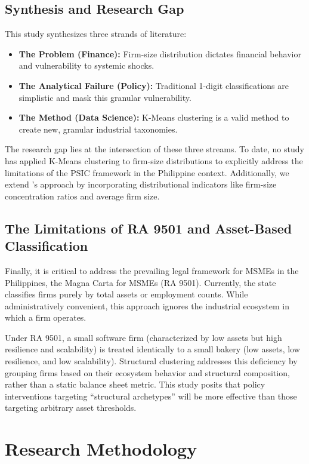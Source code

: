 \documentclass[acmtog, nonacm]{acmart}
\begin{document}
\subsection{Synthesis and Research Gap}
This study synthesizes three strands of literature:
\begin{itemize}
    \item \textbf{The Problem (Finance):} Firm-size distribution dictates financial behavior and vulnerability to systemic shocks.
    \item \textbf{The Analytical Failure (Policy):} Traditional 1-digit classifications are simplistic and mask this granular vulnerability.
    \item \textbf{The Method (Data Science):} K-Means clustering is a valid method to create new, granular industrial taxonomies.
\end{itemize}

The research gap lies at the intersection of these three streams. To date, no study has applied K-Means clustering to firm-size distributions to explicitly address the limitations of the PSIC framework in the Philippine context. Additionally, we extend \citet{karaca2018}'s approach by incorporating distributional indicators like firm-size concentration ratios and average firm size.

\subsection{The Limitations of RA 9501 and Asset-Based Classification}
Finally, it is critical to address the prevailing legal framework for MSMEs in the Philippines, the Magna Carta for MSMEs (RA 9501). Currently, the state classifies firms purely by total assets or employment counts. While administratively convenient, this approach ignores the industrial ecosystem in which a firm operates.

Under RA 9501, a small software firm (characterized by low assets but high resilience and scalability) is treated identically to a small bakery (low assets, low resilience, and low scalability). Structural clustering addresses this deficiency by grouping firms based on their ecosystem behavior and structural composition, rather than a static balance sheet metric. This study posits that policy interventions targeting ``structural archetypes'' will be more effective than those targeting arbitrary asset thresholds.


\section{Research Methodology}
\end{document}
